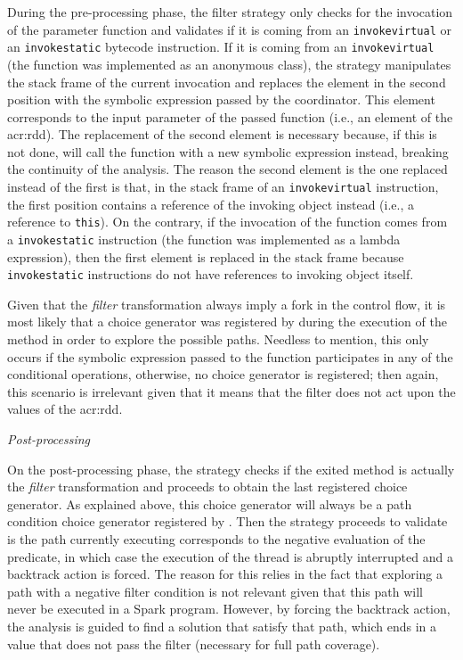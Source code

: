 During the pre-processing phase, the filter strategy only checks for the invocation of the parameter function and validates if it is coming from an \texttt{invokevirtual} or an \texttt{invokestatic} bytecode instruction. If it is coming from an \texttt{invokevirtual} (the function was implemented as an anonymous class), the strategy manipulates the stack frame of the current invocation and replaces the element in the second position with the symbolic expression passed by the coordinator. This element corresponds to the input parameter of the passed function (i.e., an element of the \acrshort{acr:rdd}). The replacement of the second element is necessary because, if this is not done, \spf will call the function with a new symbolic expression instead, breaking the continuity of the analysis. The reason the second element is the one replaced instead of the first is that, in the stack frame of an \texttt{invokevirtual} instruction, the first position contains a reference of the invoking object instead (i.e., a reference to \texttt{this}). On the contrary, if the invocation of the function comes from a \texttt{invokestatic} instruction (the function was implemented as a lambda expression), then the first element is replaced in the stack frame because \texttt{invokestatic} instructions do not have references to invoking object itself.

Given that the \textit{filter} transformation always imply a fork in the control flow, it is most likely that a choice generator was registered by \spf
during the execution of the method in order to explore the possible paths. Needless to mention, this only occurs if the symbolic expression passed to the function participates in any of the conditional operations, otherwise, no choice generator is registered; then again, this scenario is irrelevant given that it means that the filter does not act upon the values of the \acrshort{acr:rdd}.

\textit{Post-processing}

On the post-processing phase, the strategy checks if the exited method is actually the \textit{filter} transformation and proceeds to obtain the last registered choice generator. As explained above, this choice generator will always be a path condition choice generator registered by \spf. Then the strategy proceeds to validate is the path currently executing corresponds to the negative evaluation of the predicate, in which case the execution of the thread is abruptly interrupted and a backtrack action is forced. The reason for this relies in the fact that exploring a path with a negative filter condition is not relevant given that this path will never be executed in a Spark program. However, by forcing the backtrack action, the analysis is guided to find a solution that satisfy that path, which ends in a value that does not pass the filter (necessary for full path coverage).

